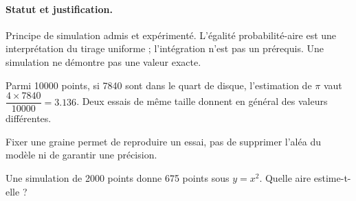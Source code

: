 \paragraph{Statut et justification.} Principe de simulation admis et expérimenté. L’égalité probabilité-aire est une interprétation du tirage uniforme ; l’intégration n’est pas un prérequis. Une simulation ne démontre pas une valeur exacte.
\begin{example}Parmi 10000 points, si 7840 sont dans le quart de disque, l’estimation de $\pi$ vaut $\dfrac{4\times 7840}{10000}=\num{3,136}$. Deux essais de même taille donnent en général des valeurs différentes.\end{example}\label{C05-EX5}
\begin{pitfall}Fixer une graine permet de reproduire un essai, pas de supprimer l’aléa du modèle ni de garantir une précision.\end{pitfall}
\begin{application}Une simulation de 2000 points donne 675 points sous $y=x^2$. Quelle aire estime-t-elle ?\end{application}\label{C05-AP5}
\mxnewpage
